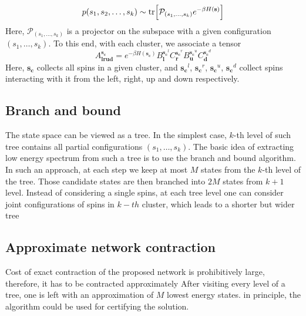     \begin{equation}
      p(s_1, s_2, \ldots, s_k) \sim \tr[\mathcal{P}_{(s_1, \ldots, s_k)} e^{-\beta H(\mathbf{s})}]
    \end{equation}
    Here, $\mathcal{P}_{(s_1, \ldots, s_k)}$ is a projector on the subspace with a
    given configuration $(s_1, \ldots, s_k)$.  To this end, with
each cluster, we associate a tensor
\begin{equation}
  A^{\mathbf{s_c}}_{\mathbf{lrud}} = e^{-\beta H(\mathbf{s_c})} B^{\mathbf{s_c}^l}_\mathbf{l}C^{\mathbf{s_c}^r}_\mathbf{r}B^{\mathbf{s_c}^u}_\mathbf{u}C^{\mathbf{s_c}^d}_\mathbf{d}
\end{equation}
Here, $\mathbf{s_c}$ collects all spins in a given cluster, and
  $\mathbf{s_c}^l$, $\mathbf{s_c}^r$, $\mathbf{s_c}^u$, $\mathbf{s_c}^d$ collect
spins interacting with it from the left, right, up and down respectively.


\subsection{Branch and bound}
The state space can be viewed as a tree. In the simplest case, $k$-th level of
such tree contains all partial configurations $(s_1, \ldots, s_k)$. The basic
idea of extracting low energy spectrum from such a tree is to use the branch
and bound algorithm. In such an approach, at each step we keep at most $M$
states from the $k$-th level of the tree. Those candidate states are then
branched into $2M$ states from $k+1$ level. Instead of considering a single
spins, at each tree level one can consider joint configurations of spins in
$k-th$ cluster, which leads to a shorter but wider tree
 
\subsection{Approximate network contraction}
Cost of exact contraction of the proposed network is prohibitively large,
therefore, it has to be contracted approximately After visiting every level of
a tree, one is left with an approximation of $M$ lowest energy states. in
principle, the algorithm could be used for certifying the solution.

